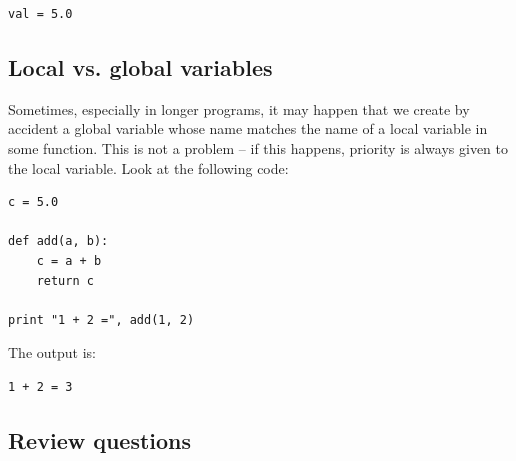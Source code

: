 \begin{verbatim}
val = 5.0
\end{verbatim}

\subsection{Local vs. global variables}

Sometimes, especially in longer programs, it may happen that we create by accident a global variable 
whose name matches the name of a local variable in some function. This is not a problem
-- if this happens, priority is always given to the local variable. Look at the 
following code:

\begin{verbatim}
c = 5.0

def add(a, b):
    c = a + b
    return c

print "1 + 2 =", add(1, 2)
\end{verbatim}
The output is:

\begin{verbatim}
1 + 2 = 3
\end{verbatim}

\subsection{Review questions}

